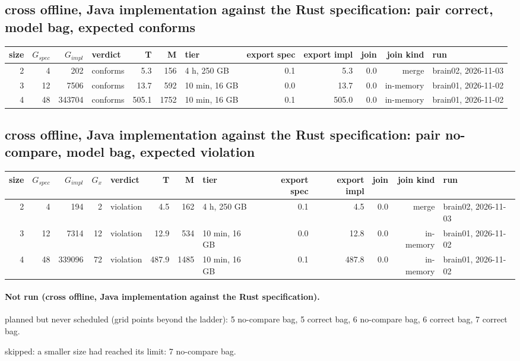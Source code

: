 \documentclass[10pt]{article}
\begin{document}
\subsection*{cross offline, Java implementation against the Rust specification: pair \textsf{correct}, model bag, expected conforms}
\begin{longtable}{@{}rrrlrrlrrrrl@{}}
\toprule
size & $G_{\mathit{spec}}$ & $G_{\mathit{impl}}$ & verdict & T & M & tier & export spec & export impl & join & join kind & run \\
\midrule
\endhead
\color{blue} 2 & 4 & 202 & conforms & 5.3 & 156 & 4 h, 250 GB & 0.1 & 5.3 & 0.0 & merge & brain02, 2026-11-03 \\
\color{red} 3 & 12 & 7506 & conforms & 13.7 & 592 & 10 min, 16 GB & 0.0 & 13.7 & 0.0 & in-memory & brain01, 2026-11-02 \\
\color{red} 4 & 48 & 343704 & conforms & 505.1 & 1752 & 10 min, 16 GB & 0.1 & 505.0 & 0.0 & in-memory & brain01, 2026-11-02 \\
\bottomrule
\end{longtable}
\subsection*{cross offline, Java implementation against the Rust specification: pair \textsf{no-compare}, model bag, expected violation}
\begin{longtable}{@{}rrrrlrrlrrrrl@{}}
\toprule
size & $G_{\mathit{spec}}$ & $G_{\mathit{impl}}$ & $G_x$ & verdict & T & M & tier & export spec & export impl & join & join kind & run \\
\midrule
\endhead
\color{blue} 2 & 4 & 194 & 2 & violation & 4.5 & 162 & 4 h, 250 GB & 0.1 & 4.5 & 0.0 & merge & brain02, 2026-11-03 \\
\color{red} 3 & 12 & 7314 & 12 & violation & 12.9 & 534 & 10 min, 16 GB & 0.0 & 12.8 & 0.0 & in-memory & brain01, 2026-11-02 \\
\color{red} 4 & 48 & 339096 & 72 & violation & 487.9 & 1485 & 10 min, 16 GB & 0.1 & 487.8 & 0.0 & in-memory & brain01, 2026-11-02 \\
\bottomrule
\end{longtable}
\paragraph{Not run (cross offline, Java implementation against the Rust specification).}
planned but never scheduled (grid points beyond the ladder): 5 no-compare bag, 5 correct bag, 6 no-compare bag, 6 correct bag, 7 correct bag.\par
skipped: a smaller size had reached its limit: 7 no-compare bag.\par
\end{document}

